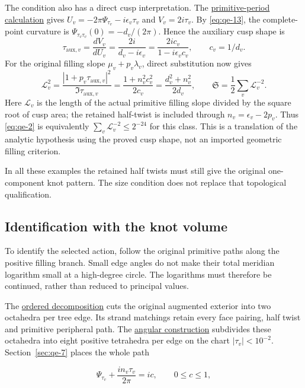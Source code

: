 The condition also has a direct cusp interpretation. The
\hyperref[sec:fg]{primitive-period calculation} gives
$U_v=-2\pi\Psi_{\tau_v}-i\epsilon_v\tau_v$ and $V_v=2i\tau_v$.
By \eqref{eq:qe-13}, the complete-point curvature is
$\Psi_{\tau_v\tau_v}(0)=-d_v/(2\pi)$. Hence the auxiliary cusp
shape is
\[
 \tau_{\mathrm{aux},v}=\frac{dV_v}{dU_v}
 =\frac{2i}{d_v-i\epsilon_v}
 =\frac{2ic_v}{1-i\epsilon_vc_v},\qquad c_v=1/d_v.
\]
For the original filling slope \(\mu_v+p_v\lambda_v\), direct substitution now gives
\begin{equation}
\mathcal L_v^2
   =\frac{|1+p_v\tau_{\mathrm{aux},v}|^2}{\Im\tau_{\mathrm{aux},v}}
   =\frac{1+n_v^2c_v^2}{2c_v}
   =\frac{d_v^2+n_v^2}{2d_v},\qquad
                 \mathfrak S=\frac12\sum_v\mathcal L_v^{-2}.
\label{eq:qe-37a}
\end{equation}
Here \(\mathcal L_v\) is the length of the actual primitive filling slope divided by the square root of cusp area; the retained half-twist is included through \(n_v=\epsilon_v-2p_v\). Thus \eqref{eq:qe-2} is equivalently \(\sum_v\mathcal L_v^{-2}\le2^{-24}\) for this class. This is a translation of the analytic hypothesis using the proved cusp shape, not an imported geometric filling criterion.

In all these examples the retained half twists must still give the
original one-component knot pattern. The size condition does not
replace that topological qualification.

\subsection{Identification with the knot volume}\label{sec:qe-11}

To identify the selected action, follow the original primitive paths
along the positive filling branch. Small edge angles do not make their
total meridian logarithm small at a high-degree circle. The logarithms
must therefore be continued, rather than reduced to principal values.

The \hyperref[sec:ft]{ordered decomposition} cuts the original augmented exterior into two octahedra per tree edge. Its strand matchings retain every face pairing, half twist and primitive peripheral path. The \hyperref[sec:fa]{angular construction} subdivides these octahedra into eight positive tetrahedra per edge on the chart \(|\tau_v|<10^{-2}\). Section~\ref{sec:qe-7} places the whole path

\[
 \Psi_{\tau_v}+\frac{i n_v\tau_v}{2\pi}=ic,\qquad 0\le c\le1,
\]

